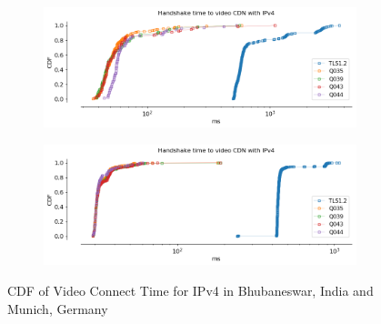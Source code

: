 \begin{frame}

\begin{figure}[!htb]
    
    \begin{subfigure}{0.5\textwidth}
        \includegraphics[width=\linewidth]{./plots/youtube/india/graph_video_connect_time.png}
    \end{subfigure}
    \begin{subfigure}{0.5\textwidth}
        \includegraphics[width=\linewidth]{./plots/youtube/munich/graph_video_connect_time.png}
    \end{subfigure}    
    \caption{CDF of Video Connect Time for IPv4 in Bhubaneswar, India and Munich, Germany}\label{fig:cdf-of-video}
\end{figure}

\end{frame}
\clearpage

